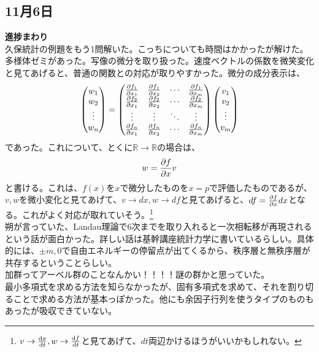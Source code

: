 \documentclass[a4paper,11pt]{jsarticle}
\numberwithin{equation}{section}
\begin{document}
\subsection*{11月6日}
\textbf{進捗まわり} \\
久保統計の例題をもう1問解いた。こっちについても時間はかかったが解けた。\\
多様体ゼミがあった。写像の微分を取り扱った。速度ベクトルの係数を微笑変化と見てあげると、普通の関数との対応が取りやすかった。微分の成分表示は、
\begin{align}
  \begin{pmatrix}
    w_1 \\
    w_2 \\
    \vdots \\
    w_n
  \end{pmatrix}
  =
  \begin{pmatrix}
    \pdv{f_1}{x_1}(p) & \pdv{f_1}{x_2}(p) & \cdots & \pdv{f_1}{x_m}(p) \\
    \pdv{f_2}{x_1}(p) & \pdv{f_2}{x_2}(p) & \cdots & \pdv{f_2}{x_m}(p) \\
    \vdots & \vdots & \ddots & \vdots \\
    \pdv{f_n}{x_1}(p) & \pdv{f_n}{x_2}(p) & \cdots & \pdv{f_n}{x_m}(p)
  \end{pmatrix}
  \begin{pmatrix}
    v_1 \\
    v_2 \\
    \vdots \\
    v_m
  \end{pmatrix}
\end{align}
であった。これについて、とくに$\mathbb{R} \to \mathbb{R}$の場合は、
\begin{align}
  w = \pdv{f}{x}(p) v
\end{align}
と書ける。これは、$f(x)$を$x$で微分したものを$x=p$で評価したものであるが、$v,w$を微小変化と見てあげて、$v\to dx, w\to df$と見てあげると、$df = \pdv{f}{x} dx$となる。これがよく対応が取れていそう。\footnote{$v\to \dv{x}{t}, w\to \dv{f}{t}$と見てあげて、$dt$両辺かけるほうがいいかもしれない。}\\
朔が言っていた、Landau理論で6次までを取り入れると一次相転移が再現されるという話が面白かった。詳しい話は基幹講座統計力学に書いているらしい。具体的には、$\pm m, 0$で自由エネルギーの停留点が出てくるから、秩序層と無秩序層が共存するということらしい。\\
加群ってアーベル群のことなんかい！！！！謎の群かと思っていた。\\
最小多項式を求める方法を知らなかったが、固有多項式を求めて、それを割り切ることで求める方法が基本っぽかった。他にも余因子行列を使うタイプのものもあったが吸収できていない。\\
\end{document}
